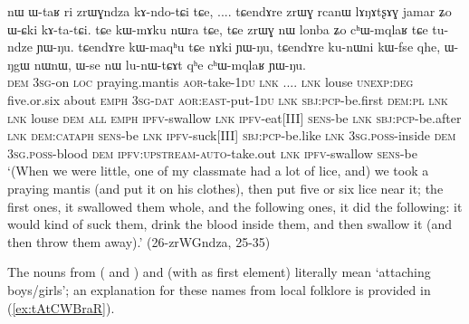 \begin{exe}
\ex \label{ex:zrWGndza}
\gll nɯ ɯ-taʁ ri zrɯɣndza kɤ-ndo-tɕi tɕe, .... tɕendɤre zrɯɣ rcanɯ lɤŋɤtʂɤɣ jamar ʑo ɯ-ɕki kɤ-ta-tɕi. tɕe kɯ-mɤku nɯra tɕe, tɕe zrɯɣ nɯ lonba ʑo cʰɯ-mqlaʁ tɕe tu-ndze ɲɯ-ŋu. tɕendɤre kɯ-maqʰu tɕe nɤki ɲɯ-ŋu,  tɕendɤre ku-nɯni kɯ-fse qhe, ɯ-ŋgɯ nɯnɯ,  ɯ-se nɯ lu-nɯ-tɕɤt qʰe cʰɯ-mqlaʁ ɲɯ-ŋu. \\
\textsc{dem} \textsc{3sg}-on \textsc{loc} praying.mantis \textsc{aor}-take-\textsc{1du} \textsc{lnk} .... \textsc{lnk} louse \textsc{unexp}:\textsc{deg} five.or.six about \textsc{emph} \textsc{3sg}-\textsc{dat} \textsc{aor}:\textsc{east}-put-\textsc{1du} \textsc{lnk} \textsc{sbj}:\textsc{pcp}-be.first \textsc{dem}:\textsc{pl} \textsc{lnk} \textsc{lnk} louse \textsc{dem} \textsc{all} \textsc{emph} \textsc{ipfv}-swallow \textsc{lnk} \textsc{ipfv}-eat[III] \textsc{sens}-be \textsc{lnk} \textsc{sbj}:\textsc{pcp}-be.after \textsc{lnk} \textsc{dem}:\textsc{cataph} \textsc{sens}-be \textsc{lnk} \textsc{ipfv}-suck[III] \textsc{sbj}:\textsc{pcp}-be.like \textsc{lnk} \textsc{3sg}.\textsc{poss}-inside \textsc{dem} \textsc{3sg}.\textsc{poss}-blood \textsc{dem} \textsc{ipfv}:\textsc{upstream}-\textsc{auto}-take.out \textsc{lnk}  \textsc{ipfv}-swallow \textsc{sens}-be \\
\glt `(When we were little, one of my classmate had a lot of lice, and) we took a praying mantis (and put it on his clothes), then put five or six lice near it; the first ones, it swallowed them whole, and the following ones,  it did the following: it would kind of suck them, drink the blood inside them, and then swallow it (and then throw them away).' (26-zrWGndza, 25-35)
\end{exe}

The nouns  from ( and ) and   (with  as first element) literally mean `attaching boys/girls'; an explanation for these names from local folklore is provided in (\ref{ex:tAtCWBraR}).

